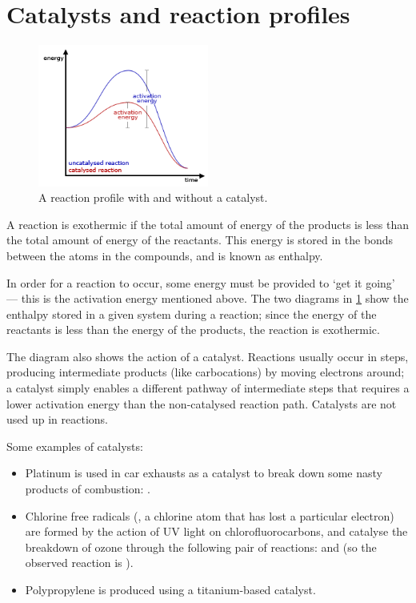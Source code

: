 \documentclass[a4paper]{memoir}
\begin{document}
\section{Catalysts and reaction profiles}
\begin{figure}
  \centering
  \includegraphics[width=0.5\textwidth]{catalyst}
  \caption{A reaction profile with and without a catalyst.\label{fig:catalyst}}
\end{figure}

A reaction is exothermic if the total amount of energy of the products is less than the total amount of energy of the reactants. This
energy is stored in the bonds between the atoms in the compounds, and is known as enthalpy.

In order for a reaction to occur, some energy must be provided to `get it going' --- this is the activation energy mentioned above. The
two diagrams in \cref{fig:catalyst} show the enthalpy stored in a given system during a reaction; since the energy of the reactants
is less than the energy of the products, the reaction is exothermic.

The diagram also shows the action of a catalyst. Reactions usually occur in steps, producing intermediate products (like carbocations) by
moving electrons around; a catalyst simply enables a different pathway of intermediate steps that requires a lower activation energy
than the non-catalysed reaction path. Catalysts are not used up in reactions.

Some examples of catalysts:
\begin{itemize}
  \item Platinum is used in car exhausts as a catalyst to break down some nasty products of combustion: .
  \item Chlorine free radicals (, a chlorine atom that has lost a particular electron) are formed by the action of UV light
        on chlorofluorocarbons, and catalyse the breakdown of ozone through the following pair of reactions: 
        and  (so the observed reaction is ).
  \item Polypropylene is produced using a titanium-based catalyst.
\end{itemize}
\end{document}
